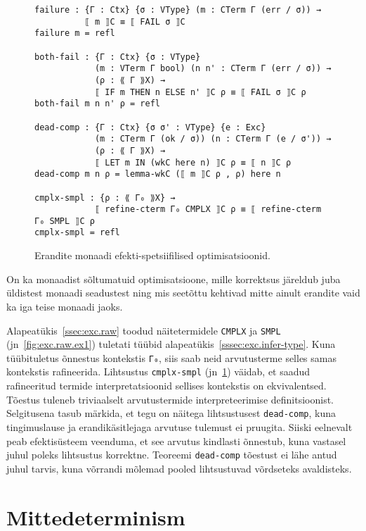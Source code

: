 \documentclass[a4paper,12pt]{article}
\begin{document}
\begin{figure}
  \begin{BVerbatim}
failure : {Γ : Ctx} {σ : VType} (m : CTerm Γ (err / σ)) →
          ⟦ m ⟧C ≡ ⟦ FAIL σ ⟧C
failure m = refl

both-fail : {Γ : Ctx} {σ : VType}
            (m : VTerm Γ bool) (n n' : CTerm Γ (err / σ)) →
            (ρ : ⟪ Γ ⟫X) → 
            ⟦ IF m THEN n ELSE n' ⟧C ρ ≡ ⟦ FAIL σ ⟧C ρ
both-fail m n n' ρ = refl

dead-comp : {Γ : Ctx} {σ σ' : VType} {e : Exc}
            (m : CTerm Γ (ok / σ)) (n : CTerm Γ (e / σ')) →
            (ρ : ⟪ Γ ⟫X) → 
            ⟦ LET m IN (wkC here n) ⟧C ρ ≡ ⟦ n ⟧C ρ
dead-comp m n ρ = lemma-wkC (⟦ m ⟧C ρ , ρ) here n

cmplx-smpl : {ρ : ⟪ Γ₀ ⟫X} →
            ⟦ refine-cterm Γ₀ CMPLX ⟧C ρ ≡ ⟦ refine-cterm Γ₀ SMPL ⟧C ρ
cmplx-smpl = refl
  \end{BVerbatim}
  \caption{Erandite monaadi efekti-spetsiifilised optimisatsioonid.}
  \label{fig:exc.opt2}
\end{figure}

On ka monaadist sõltumatuid optimisatsioone, mille korrektsus järeldub juba üldistest monaadi seadustest ning mis seetõttu kehtivad mitte ainult erandite vaid ka iga teise monaadi jaoks.

Alapeatükis~\ref{ssec:exc.raw} toodud näitetermidele {\tt CMPLX} ja {\tt SMPL} (jn~\ref{fig:exc.raw.ex1}) tuletati tüübid alapeatükis~\ref{sssec:exc.infer-type}.
Kuna tüübituletus õnnestus kontekstis {\tt Γ₀}, siis saab neid arvutusterme selles samas kontekstis rafineerida.
Lihtsustus {\tt cmplx-smpl} (jn~\ref{fig:exc.opt2}) väidab, et saadud rafineeritud termide interpretatsioonid sellises kontekstis on ekvivalentsed.
Tõestus tuleneb triviaalselt arvutustermide interpreteerimise definitsioonist.
Selgitusena tasub märkida, et tegu on näitega lihtsustusest {\tt dead-comp}, kuna tingimuslause ja erandikäsitlejaga arvutuse tulemust ei pruugita.
Siiski eelnevalt peab efektisüsteem veenduma, et see arvutus kindlasti õnnestub, kuna vastasel juhul poleks lihtsustus korrektne.
Teoreemi {\tt dead-comp} tõestust ei lähe antud juhul tarvis, kuna võrrandi mõlemad pooled lihtsustuvad võrdseteks avaldisteks.

\clearpage\vspace*{0pt}

\section{Mittedeterminism}
\end{document}
